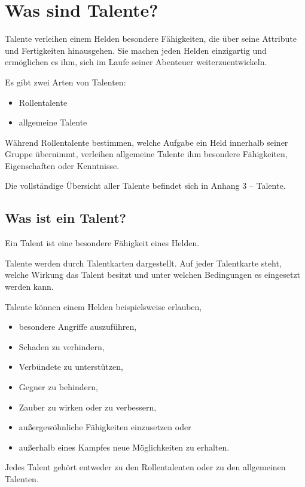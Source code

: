 \chapter{Was sind Talente?}

Talente verleihen einem Helden besondere Fähigkeiten, die über seine Attribute und Fertigkeiten hinausgehen. Sie machen jeden Helden einzigartig und ermöglichen es ihm, sich im Laufe seiner Abenteuer weiterzuentwickeln.

Es gibt zwei Arten von Talenten:

\begin{itemize}
  \item Rollentalente
  \item allgemeine Talente
\end{itemize}

Während Rollentalente bestimmen, welche Aufgabe ein Held innerhalb seiner Gruppe übernimmt, verleihen allgemeine Talente ihm besondere Fähigkeiten, Eigenschaften oder Kenntnisse.

Die vollständige Übersicht aller Talente befindet sich in Anhang 3 -- Talente.

\section{Was ist ein Talent?}

Ein Talent ist eine besondere Fähigkeit eines Helden.

Talente werden durch Talentkarten dargestellt. Auf jeder Talentkarte steht, welche Wirkung das Talent besitzt und unter welchen Bedingungen es eingesetzt werden kann.

Talente können einem Helden beispielsweise erlauben,

\begin{itemize}
  \item besondere Angriffe auszuführen,
  \item Schaden zu verhindern,
  \item Verbündete zu unterstützen,
  \item Gegner zu behindern,
  \item Zauber zu wirken oder zu verbessern,
  \item außergewöhnliche Fähigkeiten einzusetzen oder
  \item außerhalb eines Kampfes neue Möglichkeiten zu erhalten.
\end{itemize}

Jedes Talent gehört entweder zu den Rollentalenten oder zu den allgemeinen Talenten.

